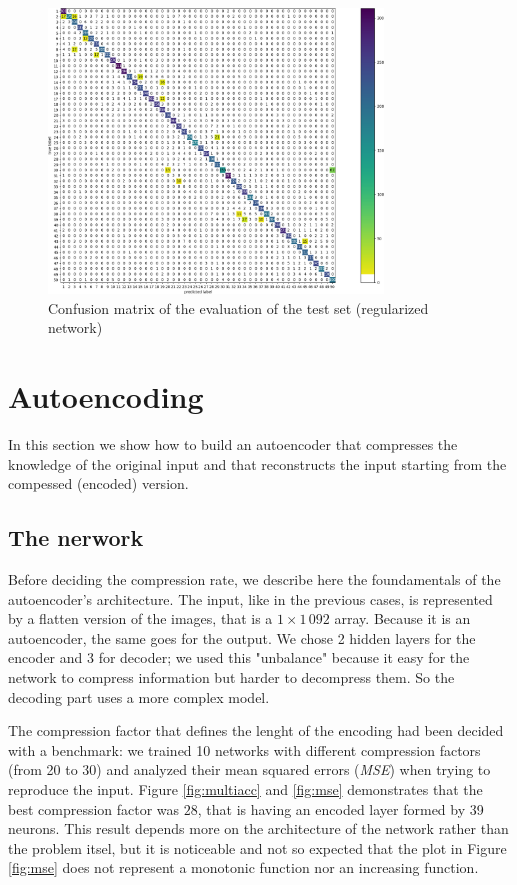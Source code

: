 \documentclass[compsoc]{IEEEtran}
\begin{document}
\begin{figure}[ht!]
\centering                                                                        
\includegraphics[width=3.5in]{regcm.png}
\captionsetup{justification=centering}
\caption{Confusion matrix of the evaluation of the test set (regularized network)}
\label{fig:regcm}
\end{figure}


\section{Autoencoding}
In this section we show how to build an autoencoder that compresses the knowledge of the original input and that reconstructs the input starting from the compessed (encoded) version.
\subsection{The nerwork}\label{sec:autonet}
Before deciding the compression rate, we describe here the foundamentals of the autoencoder's architecture. The input, like in the previous cases, is represented by a flatten version of the images, that is a $1\times1\,092$ array. Because it is an autoencoder, the same goes for the output. We chose 2 hidden layers for the encoder and 3 for decoder; we used this "unbalance" because it easy for the network to compress information but harder to decompress them. So the decoding part uses a more complex model.\par
The compression factor that defines the lenght of the encoding had been decided with a benchmark: we trained 10 networks with different compression factors (from 20 to 30) and analyzed their mean squared errors (\emph{MSE}) when trying to reproduce the input. Figure \ref{fig:multiacc} and \ref{fig:mse} demonstrates that the best compression factor was $28$, that is having an encoded layer formed by 39 neurons. This result depends more on the architecture of the network rather than the problem itsel, but it is noticeable and not so expected that the plot in Figure \ref{fig:mse} does not represent a monotonic function nor an increasing function.\par
\end{document}
